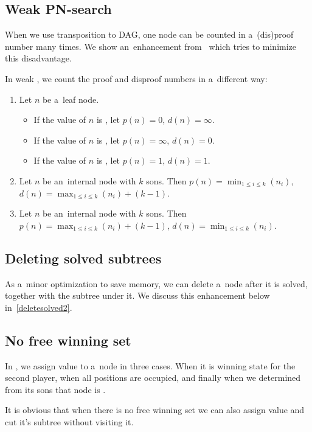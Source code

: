 \subsection{Weak PN-search} \label{weak}

When we use transposition to DAG, one node can be counted in a~(dis)proof number many times.
We show an~enhancement from~\cite{cweak} which tries to minimize this disadvantage. 

In weak , we count the proof and disproof numbers in a~different way:
\begin{enumerate} 
	\item Let $n$ be a~leaf node. 
		\begin{itemize}
			\item If the value of $n$ is , let $p(n)=0$, $d(n)=\infty$.
			\item If the value of $n$ is , let $p(n)=\infty$, $d(n)=0$.
			\item If the value of $n$ is , let $p(n)=1$, $d(n)=1$.
		\end{itemize}
	\item Let $n$ be an~internal  node with $k$ sons. Then \newline
		$p(n) = \min_{1 \le i \le k}(n_i)$, \newline
		$d(n) = \max_{1 \le i \le k}(n_i) + (k-1)$. 
	\item Let $n$ be an~internal  node with $k$ sons. Then \newline
		$p(n) = \max_{1 \le i \le k}(n_i) + (k-1)$, \newline 
		$d(n) = \min_{1 \le i \le k}(n_i)$.
\end{enumerate}
		
\subsection{Deleting solved subtrees} \label{deletesolved}

As a~minor optimization to save memory, we can delete a~node after it is solved,
together with the subtree under it. We discuss this enhancement below in~\ref{deletesolved2}.

\subsection{No free winning set} \label{nofreeK4}

In , we assign value  to a~node in three cases. When it
is winning state for the second player, when all positions are occupied, and finally
when we determined from its sons that node is .

It is obvious that when there is no free winning set we can also assign
value  and cut it's subtree without visiting it.

